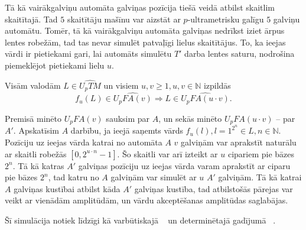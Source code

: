 \documentclass{ludis}
\begin{document}
\begin{pieradijums}
Tā kā vairākgalviņu automāta galviņas pozīcija tiešā veidā atbilst skaitlim skaitītajā. Tad $5$ skaitītāju mašīnu var aizstāt ar $p$-ultrametrisku galīgu $5$ galviņu automātu. Tomēr, tā kā vairākgalviņu automāta galviņas nedrīkst iziet ārpus lentes robežām, tad tas nevar simulēt patvaļīgi lielus skaitītājus. To, ka ieejas vārdi ir pietiekami gari, lai automāts simulētu $T'$ darba lentes saturu, nodrošina piemeklējot pietiekami lielu $u$.
\end{pieradijums}

\begin{lemma} \label{reizinajums}
Visām valodām $L \in \widehat{U_pTM}$ un visiem $u, v \geq 1, u, v \in \mathbb{N}$ izpildās
\[
	f_u(L) \in \widehat{U_pFA(v)} \Rightarrow L \in \widehat{U_pFA(u \cdot v)}.
\]
\end{lemma}
\begin{pieradijums}
Premisā minēto $U_pFA(v)$ sauksim par $A$, un sekās minēto $U_pFA(u \cdot v)$ -- par $A'$.
Apskatīsim $A$ darbību, ja ieejā saņemts vārds $f_u(l), l = 1^{2^n} \in L, n \in \mathbb{N}$. Pozīciju uz ieejas vārda katrai no automāta $A$ $v$ galviņām var aprakstīt naturālu ar skaitli robežās $\left[0, 2^{u \cdot n} -1 \right]$. Šo skaitli var arī izteikt ar $u$ cipariem pie bāzes $2^n$. Tā kā katras $A'$ galviņas pozīciju uz ieejas vārda varam aprakstīt ar ciparu pie bāzes $2^n$, tad katru no $A$ galviņām var simulēt ar $u$ $A'$ galviņām. Tā kā katrai $A$ galviņas kustībai atbilst kāda $A'$ galviņas kustība, tad atbilstošās pārejas var veikt ar vienādām amplitūdām, un vārdu akceptēšanas amplitūdas saglabājas.

Šī simulācija notiek līdzīgi kā varbūtiskajā ~\citep{Macarie1995} un determinētajā gadījumā ~\citep{Monien1980}.
\end{pieradijums}
\end{document}
